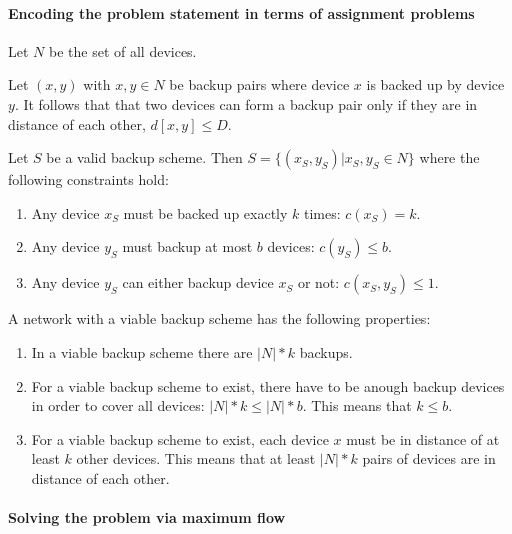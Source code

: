 
\paragraph{Encoding the problem statement in terms of assignment problems}

Let $N$ be the set of all devices.

Let $(x, y)$ with $ x, y \in N$ be backup pairs where device $x$ is backed up by device $y$. It follows that that two devices can form a backup pair only if they are in distance of each other, $d[x, y] \leq D$.

Let $S$ be a valid backup scheme. Then $S = \{(x_S, y_S) | x_S, y_S \in N \}$ where the following constraints hold:

\begin{enumerate}

	\item Any device $x_S$ must be backed up exactly $k$ times: $c(x_S) = k$.
	
	\item Any device $y_S$ must backup at most $b$ devices: $c(y_S) \leq b$.
	
	\item Any device $y_S$ can either backup device $x_S$ or not: $c(x_S, y_S) \leq 1$.

\end{enumerate}

A network with a viable backup scheme has the following properties:
\begin{enumerate}
	\item In a viable backup scheme there are $|N| * k$ backups.
	
	\item For a viable backup scheme to exist, there have to be anough backup devices in order to cover all devices: $|N| *k \leq |N| * b$. This means that $k \leq b$.
	
	\item For a viable backup scheme to exist, each device $x$ must be in distance of at least $k$ other devices. This means that at least $|N| * k$ pairs of devices are in distance of each other.
\end{enumerate}

\paragraph{Solving the problem via maximum flow}

